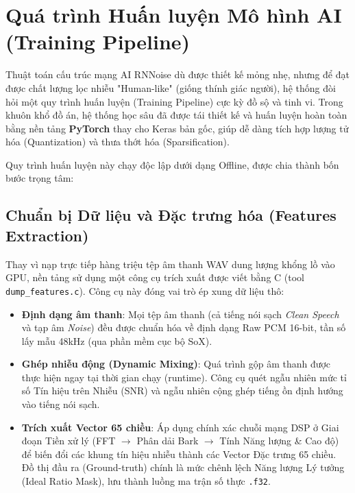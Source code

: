 \section{Quá trình Huấn luyện Mô hình AI (Training Pipeline)}

Thuật toán cấu trúc mạng AI RNNoise dù được thiết kế mỏng nhẹ, nhưng để đạt được chất lượng lọc nhiễu "Human-like" (giống thính giác người), hệ thống đòi hỏi một quy trình huấn luyện (Training Pipeline) cực kỳ đồ sộ và tinh vi. Trong khuôn khổ đồ án, hệ thống học sâu đã được tái thiết kế và huấn luyện hoàn toàn bằng nền tảng \textbf{PyTorch} thay cho Keras bản gốc, giúp dễ dàng tích hợp lượng tử hóa (Quantization) và thưa thớt hóa (Sparsification).

Quy trình huấn luyện này chạy độc lập dưới dạng Offline, được chia thành bốn bước trọng tâm:

\subsection{Chuẩn bị Dữ liệu và Đặc trưng hóa (Features Extraction)}
Thay vì nạp trực tiếp hàng triệu tệp âm thanh WAV dung lượng khổng lồ vào GPU, nền tảng sử dụng một công cụ trích xuất được viết bằng C (tool \texttt{dump\_features.c}). Công cụ này đóng vai trò ép xung dữ liệu thô:
\begin{itemize}
    \item \textbf{Định dạng âm thanh}: Mọi tệp âm thanh (cả tiếng nói sạch \textit{Clean Speech} và tạp âm \textit{Noise}) đều được chuẩn hóa về định dạng Raw PCM 16-bit, tần số lấy mẫu 48kHz (qua phần mềm cục bộ SoX).
    \item \textbf{Ghép nhiễu động (Dynamic Mixing)}: Quá trình gộp âm thanh được thực hiện ngay tại thời gian chạy (runtime). Công cụ quét ngẫu nhiên mức tỉ số Tín hiệu trên Nhiễu (SNR) và ngẫu nhiên cộng ghép tiếng ồn định hướng vào tiếng nói sạch.
    \item \textbf{Trích xuất Vector 65 chiều}: Áp dụng chính xác chuỗi mạng DSP ở Giai đoạn Tiền xử lý (FFT $\rightarrow$ Phân dải Bark $\rightarrow$ Tính Năng lượng \& Cao độ) để biến đổi các khung tín hiệu nhiễu thành các Vector Đặc trưng 65 chiều. Đồ thị đầu ra (Ground-truth) chính là mức chênh lệch Năng lượng Lý tưởng (Ideal Ratio Mask), lưu thành luồng ma trận số thực \texttt{.f32}.
\end{itemize}

